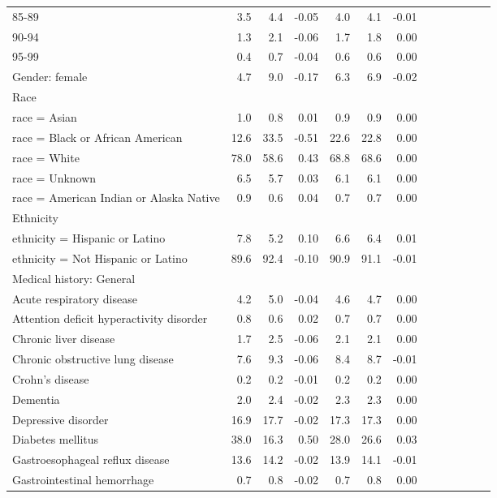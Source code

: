\documentclass[11pt,]{article}
\begin{document}
\begin{longtable}{lrrrrrrrrrrrr}
      85-89 &  3.5 &  4.4 & -0.05 &  4.0 &  4.1 & -0.01 \\ 
      90-94 &  1.3 &  2.1 & -0.06 &  1.7 &  1.8 &  0.00 \\ 
      95-99 &  0.4 &  0.7 & -0.04 &  0.6 &  0.6 &  0.00 \\ 
  Gender: female &  4.7 &  9.0 & -0.17 &  6.3 &  6.9 & -0.02 \\ 
  Race &    &    &     &    &    &     \\ 
      race = Asian &  1.0 &  0.8 &  0.01 &  0.9 &  0.9 &  0.00 \\ 
      race = Black or African American & 12.6 & 33.5 & -0.51 & 22.6 & 22.8 &  0.00 \\ 
      race = White & 78.0 & 58.6 &  0.43 & 68.8 & 68.6 &  0.00 \\ 
      race = Unknown &  6.5 &  5.7 &  0.03 &  6.1 &  6.1 &  0.00 \\ 
      race = American Indian or Alaska Native &  0.9 &  0.6 &  0.04 &  0.7 &  0.7 &  0.00 \\ 
  Ethnicity &    &    &     &    &    &     \\ 
      ethnicity = Hispanic or Latino &  7.8 &  5.2 &  0.10 &  6.6 &  6.4 &  0.01 \\ 
      ethnicity = Not Hispanic or Latino & 89.6 & 92.4 & -0.10 & 90.9 & 91.1 & -0.01 \\ 
  Medical history: General &    &    &     &    &    &     \\ 
      Acute respiratory disease &  4.2 &  5.0 & -0.04 &  4.6 &  4.7 &  0.00 \\ 
      Attention deficit hyperactivity disorder &  0.8 &  0.6 &  0.02 &  0.7 &  0.7 &  0.00 \\ 
      Chronic liver disease &  1.7 &  2.5 & -0.06 &  2.1 &  2.1 &  0.00 \\ 
      Chronic obstructive lung disease &  7.6 &  9.3 & -0.06 &  8.4 &  8.7 & -0.01 \\ 
      Crohn's disease &  0.2 &  0.2 & -0.01 &  0.2 &  0.2 &  0.00 \\ 
      Dementia &  2.0 &  2.4 & -0.02 &  2.3 &  2.3 &  0.00 \\ 
      Depressive disorder & 16.9 & 17.7 & -0.02 & 17.3 & 17.3 &  0.00 \\ 
      Diabetes mellitus & 38.0 & 16.3 &  0.50 & 28.0 & 26.6 &  0.03 \\ 
      Gastroesophageal reflux disease & 13.6 & 14.2 & -0.02 & 13.9 & 14.1 & -0.01 \\ 
      Gastrointestinal hemorrhage &  0.7 &  0.8 & -0.02 &  0.7 &  0.8 &  0.00 \\ 

\end{longtable}
\end{document}
